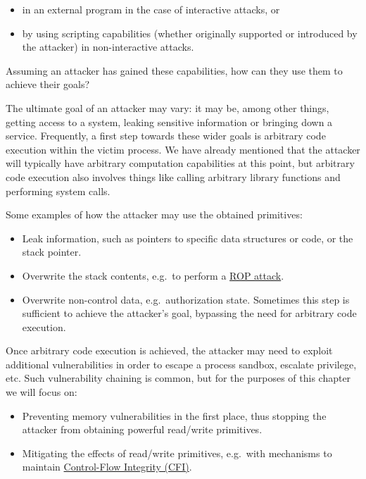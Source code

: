 \documentclass[
  a4paper,
]{report}
\providecommand{\tightlist}{%
  \setlength{\itemsep}{0pt}\setlength{\parskip}{0pt}}
\begin{document}
\begin{itemize}
\tightlist
\item
  in an external program in the case of interactive attacks, or
\item
  by using scripting capabilities (whether originally supported or
  introduced by the attacker) in non-interactive attacks.
\end{itemize}

Assuming an attacker has gained these capabilities, how can they use
them to achieve their goals?

The ultimate goal of an attacker may vary: it may be, among other
things, getting access to a system, leaking sensitive information or
bringing down a service. Frequently, a first step towards these wider
goals is arbitrary code execution within
the victim process. We have already mentioned that the attacker will
typically have arbitrary computation capabilities at this point, but
arbitrary code execution also involves things like calling arbitrary
library functions and performing system calls.

Some examples of how the attacker may use the obtained primitives:

\begin{itemize}
\tightlist
\item
  Leak information, such as pointers to specific data structures or
  code, or the stack pointer.
\item
  Overwrite the stack contents, e.g.~to perform a \hyperref[rop]{ROP
  attack}.
\item
  Overwrite non-control data, e.g.~authorization state. Sometimes this
  step is sufficient to achieve the attacker's goal, bypassing the need
  for arbitrary code execution.
\end{itemize}

Once arbitrary code execution is achieved, the attacker may need to
exploit additional vulnerabilities in order to escape a process sandbox,
escalate privilege, etc. Such vulnerability chaining is common, but for
the purposes of this chapter we will focus on:

\begin{itemize}
\tightlist
\item
  Preventing memory vulnerabilities in the first place, thus stopping
  the attacker from obtaining powerful read/write primitives.
\item
  Mitigating the effects of read/write primitives, e.g.~with mechanisms
  to maintain \hyperref[control-flow-integrity-cfi]{Control-Flow
  Integrity (CFI)}.
\end{itemize}
\end{document}
